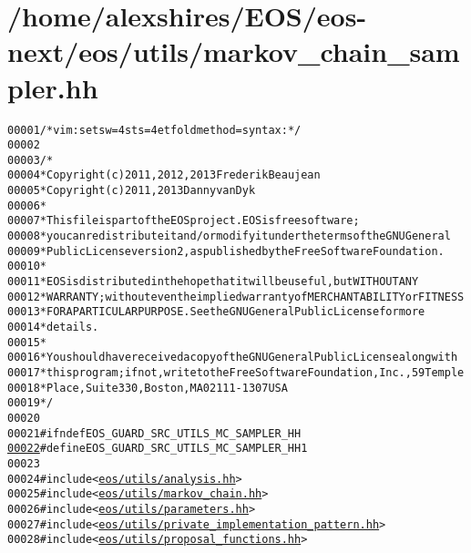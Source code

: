 \hypertarget{markov__chain__sampler_8hh_source}{
\section{/home/alexshires/EOS/eos-\/next/eos/utils/markov\_\-chain\_\-sampler.hh}
}


\begin{footnotesize}\begin{alltt}
00001 \textcolor{comment}{/* vim: set sw=4 sts=4 et foldmethod=syntax : */}
00002 
00003 \textcolor{comment}{/*}
00004 \textcolor{comment}{ * Copyright (c) 2011, 2012, 2013 Frederik Beaujean}
00005 \textcolor{comment}{ * Copyright (c) 2011, 2013 Danny van Dyk}
00006 \textcolor{comment}{ *}
00007 \textcolor{comment}{ * This file is part of the EOS project. EOS is free software;}
00008 \textcolor{comment}{ * you can redistribute it and/or modify it under the terms of the GNU General}
00009 \textcolor{comment}{ * Public License version 2, as published by the Free Software Foundation.}
00010 \textcolor{comment}{ *}
00011 \textcolor{comment}{ * EOS is distributed in the hope that it will be useful, but WITHOUT ANY}
00012 \textcolor{comment}{ * WARRANTY; without even the implied warranty of MERCHANTABILITY or FITNESS}
00013 \textcolor{comment}{ * FOR A PARTICULAR PURPOSE.  See the GNU General Public License for more}
00014 \textcolor{comment}{ * details.}
00015 \textcolor{comment}{ *}
00016 \textcolor{comment}{ * You should have received a copy of the GNU General Public License along with}
00017 \textcolor{comment}{ * this program; if not, write to the Free Software Foundation, Inc., 59 Temple}
00018 \textcolor{comment}{ * Place, Suite 330, Boston, MA  02111-1307  USA}
00019 \textcolor{comment}{ */}
00020 
00021 \textcolor{preprocessor}{#ifndef EOS\_GUARD\_SRC\_UTILS\_MC\_SAMPLER\_HH}
\hypertarget{markov__chain__sampler_8hh_source_l00022}{}\hyperlink{markov__chain__sampler_8hh_a564984576aa31b9ed76d28c2b0bd2b2f}{00022} \textcolor{preprocessor}{}\textcolor{preprocessor}{#define EOS\_GUARD\_SRC\_UTILS\_MC\_SAMPLER\_HH 1}
00023 \textcolor{preprocessor}{}
00024 \textcolor{preprocessor}{#include <\hyperlink{analysis_8hh}{eos/utils/analysis.hh}>}
00025 \textcolor{preprocessor}{#include <\hyperlink{markov__chain_8hh}{eos/utils/markov_chain.hh}>}
00026 \textcolor{preprocessor}{#include <\hyperlink{parameters_8hh}{eos/utils/parameters.hh}>}
00027 \textcolor{preprocessor}{#include <\hyperlink{private__implementation__pattern_8hh}{eos/utils/private_implementation_pattern.hh}>}
00028 \textcolor{preprocessor}{#include <\hyperlink{proposal__functions_8hh}{eos/utils/proposal_functions.hh}>}

\end{alltt}
\end{footnotesize}
